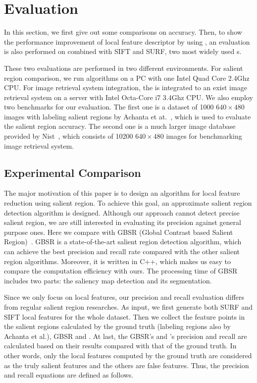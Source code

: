 \section{Evaluation}
\label{sec:evaluation}

In this section, we first give out some comparisons on accuracy. Then, to show the performance improvement of local feature descriptor by using {\sys}, an evaluation is also performed on {\sys} combined with SIFT and SURF, two most widely used {\lfea}s.

These two evaluations are performed in two different environments. For salient region comparison, we run algorithms on a PC with one Intel Quad Core 2.4Ghz CPU. For image retrieval system integration, the {\sys} is integrated to an exist image retrieval system on a server with Intel Octa-Core i7 3.4Ghz CPU. We also employ two benchmarks for our evaluation. The first one is a dataset of 1000 $640\times480$images with labeling salient regions by Achanta et at.~\cite{achanta2009frequency}, which is used to evaluate the salient region accuracy. The second one is a much larger image database provided by Nist~\cite{nister2006scalable}, which consists of 10200 $640\times480$ images for benchmarking image retrieval system.

\subsection{Experimental Comparison}
\label{sec:evaluation_comparison}

The major motivation of this paper is to design an algorithm for local feature reduction using salient region. To achieve this goal, an approximate salient region detection algorithm is designed. Although our approach cannot detect precise salient region, we are still interested in evaluating its precision against general purpose ones. Here we compare {\sys} with GBSR (Global Contrast based Salient Region)~\cite{cheng2011global}. GBSR is a state-of-the-art salient region detection algorithm, which can achieve the best precision and recall rate compared with the other salient region algorithms. Moreover, it is written in C++, which makes us easy to compare the computation efficiency with ours. The processing time of GBSR includes two parts: the saliency map detection and its segmentation.

Since we only focus on local features, our precision and recall evaluation differs from regular salient region researches. As input, we first generate both SURF and SIFT local features for the whole dataset. Then we collect the feature points in the salient regions calculated by the ground truth (labeling regions also by Achanta et al.), GBSR and {\sys}. At last, the GBSR's and {\sys}'s precision and recall are calculated based on their results compared with that of the ground truth. In other words, only the local features computed by the ground truth are considered as the truly salient features and the others are false features. Thus, the precision and recall equations are defined as follows.

